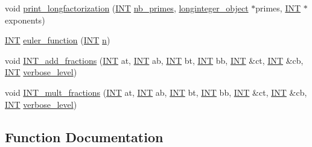 \begin{DoxyCompactItemize}
\item 
void \mbox{\hyperlink{number__theory_8_c_a43deb5f98680ff46f2311c17d55bba44}{print\+\_\+longfactorization}} (\mbox{\hyperlink{galois_8h_a09fddde158a3a20bd2dcadb609de11dc}{I\+NT}} \mbox{\hyperlink{global_8_c_a41da378679c384026d4b3cb2941236df}{nb\+\_\+primes}}, \mbox{\hyperlink{classlonginteger__object}{longinteger\+\_\+object}} $\ast$primes, \mbox{\hyperlink{galois_8h_a09fddde158a3a20bd2dcadb609de11dc}{I\+NT}} $\ast$exponents)
\item 
\mbox{\hyperlink{galois_8h_a09fddde158a3a20bd2dcadb609de11dc}{I\+NT}} \mbox{\hyperlink{number__theory_8_c_aadadc930a0f4765940304423547b50d0}{euler\+\_\+function}} (\mbox{\hyperlink{galois_8h_a09fddde158a3a20bd2dcadb609de11dc}{I\+NT}} \mbox{\hyperlink{simeon_8_c_a7f2cd26777ce0ff3fdaf8d02aacbddfb}{n}})
\item 
void \mbox{\hyperlink{number__theory_8_c_a63dca96ff4af450258e99520cc36541c}{I\+N\+T\+\_\+add\+\_\+fractions}} (\mbox{\hyperlink{galois_8h_a09fddde158a3a20bd2dcadb609de11dc}{I\+NT}} at, \mbox{\hyperlink{galois_8h_a09fddde158a3a20bd2dcadb609de11dc}{I\+NT}} ab, \mbox{\hyperlink{galois_8h_a09fddde158a3a20bd2dcadb609de11dc}{I\+NT}} bt, \mbox{\hyperlink{galois_8h_a09fddde158a3a20bd2dcadb609de11dc}{I\+NT}} bb, \mbox{\hyperlink{galois_8h_a09fddde158a3a20bd2dcadb609de11dc}{I\+NT}} \&ct, \mbox{\hyperlink{galois_8h_a09fddde158a3a20bd2dcadb609de11dc}{I\+NT}} \&cb, \mbox{\hyperlink{galois_8h_a09fddde158a3a20bd2dcadb609de11dc}{I\+NT}} \mbox{\hyperlink{simeon_8_c_a818073fbcc2f439e7c56952f67386122}{verbose\+\_\+level}})
\item 
void \mbox{\hyperlink{number__theory_8_c_ad45987433ae2f19d3af9b98fc4418559}{I\+N\+T\+\_\+mult\+\_\+fractions}} (\mbox{\hyperlink{galois_8h_a09fddde158a3a20bd2dcadb609de11dc}{I\+NT}} at, \mbox{\hyperlink{galois_8h_a09fddde158a3a20bd2dcadb609de11dc}{I\+NT}} ab, \mbox{\hyperlink{galois_8h_a09fddde158a3a20bd2dcadb609de11dc}{I\+NT}} bt, \mbox{\hyperlink{galois_8h_a09fddde158a3a20bd2dcadb609de11dc}{I\+NT}} bb, \mbox{\hyperlink{galois_8h_a09fddde158a3a20bd2dcadb609de11dc}{I\+NT}} \&ct, \mbox{\hyperlink{galois_8h_a09fddde158a3a20bd2dcadb609de11dc}{I\+NT}} \&cb, \mbox{\hyperlink{galois_8h_a09fddde158a3a20bd2dcadb609de11dc}{I\+NT}} \mbox{\hyperlink{simeon_8_c_a818073fbcc2f439e7c56952f67386122}{verbose\+\_\+level}})
\end{DoxyCompactItemize}


\subsection{Function Documentation}
\mbox{\label{number__theory_8_c_a1ca85cd5ee0eea1bde939f936a19d304}} 
